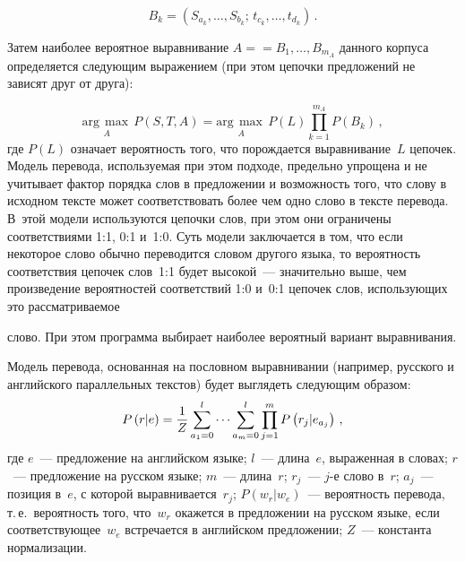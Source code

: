 \begin{multicols}{2}
\vspace*{4pt}

\noindent
     \begin{equation*}
     B_k=\left( S_{a_k},\ldots ,S_{b_k};\,t_{c_k},\ldots ,t_{d_k}\right)\,.
     \end{equation*}
     
     Затем наиболее вероятное выравнивание $A=$\linebreak $=B_1,\ldots , B_{m_A}$ 
данного корпуса определяется следующим выражением (при этом цепочки 
предложений не зависят друг от друга):

\vspace*{4pt}

\noindent
     \begin{equation*}
     \underset{A}{\mathrm{arg}\,\max}\,P\left(S,T,A\right ) = 
\underset{A}{\mathrm{arg}\,\max}\,P\left(L\right)\prod\limits_{k=1}^{m_A} 
P(B_k)\,,
     \end{equation*}
где $P(L)$ означает вероятность того, что порождается выравнивание~$L$ 
цепочек. Модель перевода, используемая при этом подходе, предельно 
упрощена и не учитывает фактор порядка слов в предложении и возможность 
того, что слову в исходном тексте может соответствовать более чем одно 
слово в тексте перевода. В~этой модели используются цепочки слов, при 
этом они ограничены соответствиями 1:1, 0:1 и~1:0. Суть модели 
заключается в том, что если некоторое слово обычно переводится словом 
другого языка, то вероятность соответствия цепочек слов~1:1 будет 
высокой~--- значительно выше, чем произведение вероятностей соответствий 
1:0 и~0:1 цепочек слов, использующих это рассматриваемое\linebreak\vspace*{-12pt}
\pagebreak

\noindent
 слово. При этом 
программа выбирает наиболее вероятный вариант выравнивания.
     
     Модель перевода, основанная на пословном выравнивании (например, 
русского и английского параллельных текстов) будет выглядеть следующим 
образом:
     \begin{equation*}
     P\left(r\vert e\right) =\displaystyle\frac{\displaystyle 1\mathstrut}{\displaystyle Z\mathstrut}\sum\limits_{a_1=0}^l \cdots 
\sum\limits_{a_m=0}^l \prod\limits_{j=1}^m P\left(r_j\vert e_{a_j}\right)\,,
     \end{equation*}
где $e$~--- предложение на английском языке; $l$~--- длина~$e$, 
выраженная в словах; $r$~--- предложение на русском языке; $m$~--- 
длина~$r$; $r_j$~--- $j$-е слово в~$r$; $a_j$~--- позиция в~$e$, с которой 
выравнивается~$r_j$; $P(w_r\vert w_e)$~--- вероятность перевода, т.\,е.\ 
вероятность того, что~$w_r$ окажется в предложении на русском языке, если 
соответствующее~$w_e$ встречается в английском предложении; $Z$~--- 
константа нормализации.
     

\end{multicols}
